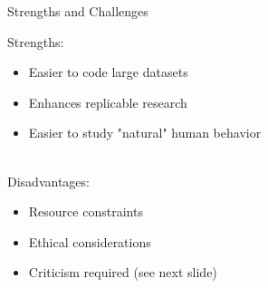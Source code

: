 \documentclass[handout]{beamer}
\begin{document}
\begin{frame}{Strengths and Challenges} 
	
	Strengths:
	\begin{itemize}
		\item Easier to code large datasets
		\item Enhances replicable research
		\item Easier to study "natural" human behavior \\\
	\end{itemize}
	
	Disadvantages:
	\begin{itemize}
		\item Resource constraints
		\item Ethical considerations
		\item Criticism required (see next slide)
	\end{itemize}



\end{frame}
\end{document}
